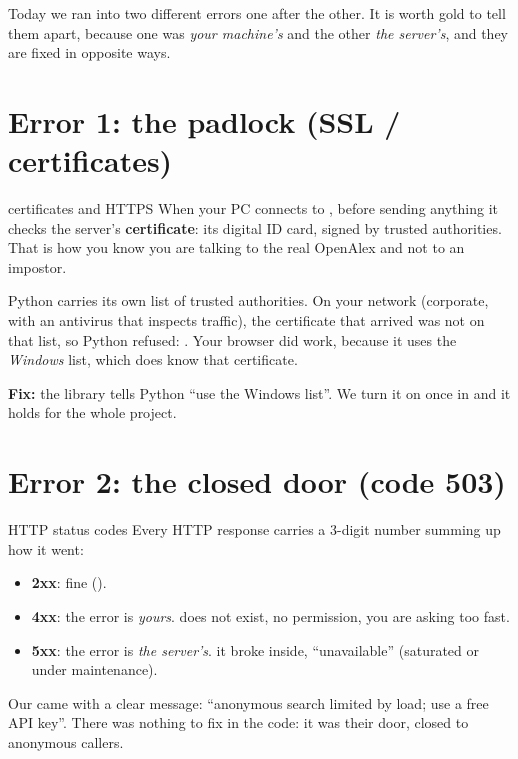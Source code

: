 \documentclass[11pt,a4paper]{article}
\begin{document}
Today we ran into two different errors one after the other. It is worth gold to tell them
apart, because one was \emph{your machine's} and the other \emph{the server's}, and they are
fixed in opposite ways.

\section{Error 1: the padlock (SSL / certificates)}

\begin{concepto}{certificates and HTTPS}
When your PC connects to , before sending anything it checks
the server's \textbf{certificate}: its digital ID card, signed by trusted authorities. That
is how you know you are talking to the real OpenAlex and not to an impostor.

Python carries its own list of trusted authorities. On your network (corporate, with an
antivirus that inspects traffic), the certificate that arrived was not on that list, so
Python refused: . Your browser did work, because it uses
the \emph{Windows} list, which does know that certificate.

\textbf{Fix:} the  library tells Python ``use the Windows list''. We turn
it on once in  and it holds for the whole project.
\end{concepto}

\section{Error 2: the closed door (code 503)}

\begin{concepto}{HTTP status codes}
Every HTTP response carries a 3-digit number summing up how it went:
\begin{itemize}
  \item \textbf{2xx}: fine ().
  \item \textbf{4xx}: the error is \emph{yours}.  does not exist,  no
        permission,  you are asking too fast.
  \item \textbf{5xx}: the error is \emph{the server's}.  it broke inside,
         ``unavailable'' (saturated or under maintenance).
\end{itemize}
Our  came with a clear message: ``anonymous search limited by load; use a free
API key''. There was nothing to fix in the code: it was their door, closed to anonymous
callers.
\end{concepto}
\end{document}
